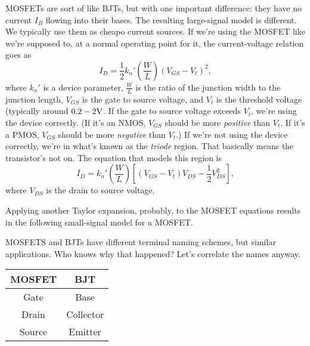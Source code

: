 MOSFETs are sort of like BJTs, but with one important difference: they have no current $I_{B}$ flowing into their bases. The resulting large-signal model is different. We typically use them as cheapo current sources. If we're using the MOSFET like we're supposed to, at a normal operating point for it, the current-voltage relation goes as
\begin{equation}
\label{eq:43}
I_{D} = \frac{1}{2} k_{n}' \left( \frac{W}{L} \right) \left( V_{GS} - V_{t} \right)^{2},
\end{equation}
where $k_{n}'$ is a device parameter, $\frac{W}{L}$ is the ratio of the junction width to the junction length, $V_{GS}$ is the gate to source voltage, and $V_{t}$ is the threshold voltage (typically around $0.2 \-- 2 \si{\V}$. If the gate to source voltage exceeds $V_{t}$, we're using the device correctly. (If it's an NMOS, $V_{GS}$ should be more \textit{positive} than $V_{t}$. If it's a PMOS, $V_{GS}$ should be more \textit{negative} than $V_{t}$.) If we're not using the device correctly, we're in what's known as the \textit{triode} region. That basically means the transistor's not on. The equation that models this region is
\begin{equation}
\label{eq:44}
I_{D} = k_{n}' \left( \frac{W}{L} \right) \left[ \left( V_{GS} - V_{t} \right) V_{DS} - \frac{1}{2} V_{DS}^{2} \right],
\end{equation}
where $V_{DS}$ is the drain to source voltage.

Applying another Taylor expansion, probably, to the MOSFET equations results in the following small-signal model for a MOSFET.

MOSFETS and BJTs have different terminal naming schemes, but similar applications. Who knows why that happened? Let's correlate the names anyway.

\begin{center}
  \begin{tabular}{|c|c|}
    \hline
  MOSFET & BJT \\
  \hline
  Gate & Base \\
  Drain & Collector \\
    Source & Emitter \\
    \hline
\end{tabular}
\end{center}

